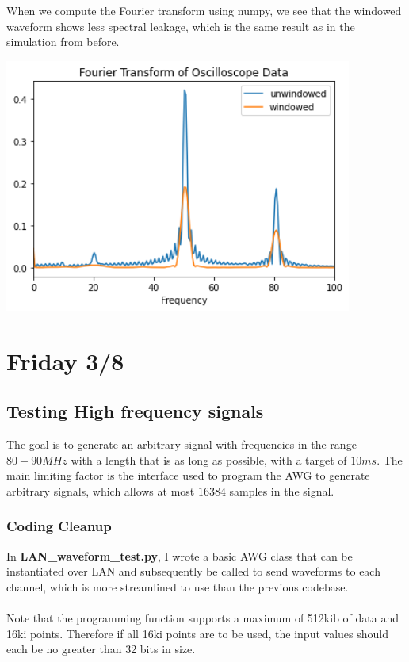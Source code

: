 \documentclass{article}
\begin{document}
    When we compute the Fourier transform using numpy, we see that the windowed waveform shows less spectral leakage, which is the same result as in the simulation from before.
    \begin{mdframed}[backgroundcolor=gray!20, align = center, userdefinedwidth = 4.8in]
    \includegraphics[width = 4.5in]{img/oscilloscopeTransform.png}
    \end{mdframed}
    \section*{Friday 3/8}
    \subsection*{Testing High frequency signals}
    The goal is to generate an arbitrary signal with frequencies in the range $80-90 MHz$ with a length that is as long as possible, with a target of $10ms.$ The main limiting factor is the interface used to program the AWG to generate arbitrary signals, which allows at most $16384$ samples in the signal.
    \subsubsection*{Coding Cleanup}
    In \textbf{LAN\_waveform\_test.py}, I wrote a basic AWG class that can be instantiated over LAN and subsequently be called to send waveforms to each channel, which is more streamlined to use than the previous codebase.\\\\
    Note that the programming function supports a maximum of 512kib of data and 16ki points. Therefore if all 16ki points are to be used, the input values should each be no greater than 32 bits in size. 
\end{document}
